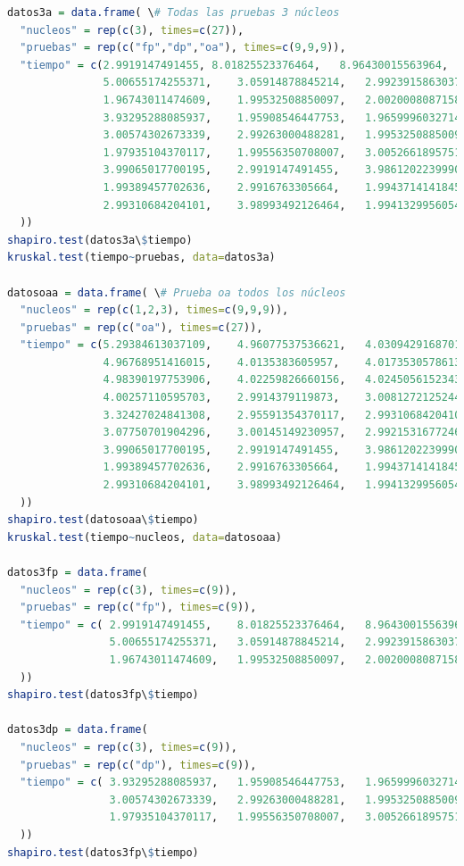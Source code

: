 \documentclass{article}
\begin{document}
\begin{lstlisting}[language=R]
datos3a = data.frame( \# Todas las pruebas 3 núcleos
  "nucleos" = rep(c(3), times=c(27)),
  "pruebas" = rep(c("fp","dp","oa"), times=c(9,9,9)),
  "tiempo" = c(2.9919147491455,	8.01825523376464,	8.96430015563964,	
               5.00655174255371,	3.05914878845214,	2.99239158630371,	
               1.96743011474609,	1.99532508850097,	2.00200080871582,	
               3.93295288085937,	1.95908546447753,	1.96599960327148,	
               3.00574302673339,	2.99263000488281,	1.99532508850097,	
               1.97935104370117,	1.99556350708007,	3.00526618957519,	
               3.99065017700195,	2.9919147491455,	3.98612022399902,	
               1.99389457702636,	2.9916763305664,	1.99437141418457,	
               2.99310684204101,	3.98993492126464,	1.99413299560546
  ))
shapiro.test(datos3a\$tiempo)
kruskal.test(tiempo~pruebas, data=datos3a)

datosoaa = data.frame( \# Prueba oa todos los núcleos
  "nucleos" = rep(c(1,2,3), times=c(9,9,9)),
  "pruebas" = rep(c("oa"), times=c(27)),
  "tiempo" = c(5.29384613037109,	4.96077537536621,	4.03094291687011,	
               4.96768951416015,	4.0135383605957,	4.01735305786132,	
               4.98390197753906,	4.02259826660156,	4.02450561523437, 
               4.00257110595703,	2.9914379119873,	3.00812721252441,	
               3.32427024841308,	2.95591354370117,	2.99310684204101,	
               3.07750701904296,	3.00145149230957,	2.9921531677246, 
               3.99065017700195,	2.9919147491455,	3.98612022399902,	
               1.99389457702636,	2.9916763305664,	1.99437141418457,	
               2.99310684204101,	3.98993492126464,	1.99413299560546
  ))
shapiro.test(datosoaa\$tiempo)
kruskal.test(tiempo~nucleos, data=datosoaa)

datos3fp = data.frame(
  "nucleos" = rep(c(3), times=c(9)),
  "pruebas" = rep(c("fp"), times=c(9)),
  "tiempo" = c(	2.9919147491455,	8.01825523376464,	8.96430015563964,	
                5.00655174255371,	3.05914878845214,	2.99239158630371,	
                1.96743011474609,	1.99532508850097,	2.00200080871582
  ))
shapiro.test(datos3fp\$tiempo)

datos3dp = data.frame(
  "nucleos" = rep(c(3), times=c(9)),
  "pruebas" = rep(c("dp"), times=c(9)),
  "tiempo" = c(	3.93295288085937,	1.95908546447753,	1.96599960327148,	
                3.00574302673339,	2.99263000488281,	1.99532508850097,	
                1.97935104370117,	1.99556350708007,	3.00526618957519
  ))
shapiro.test(datos3fp\$tiempo)

\end{lstlisting}
\end{document}
